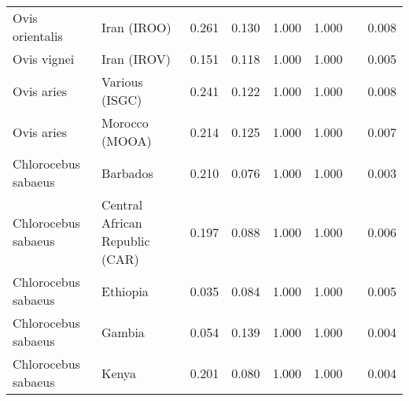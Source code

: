 \begin{center}
\begin{adjustbox}{width = 1\textwidth}
\begin{tabular}{|l|l|r|r|r|r|r|}
     Ovis orientalis &                     Iran (IROO) &                                              0.261 &                                              0.130 &                1.000 &                                  1.000~~ &              0.008 \\
         Ovis vignei &                     Iran (IROV) &                                              0.151 &                                              0.118 &                1.000 &                                  1.000~~ &              0.005 \\
          Ovis aries &                  Various (ISGC) &                                              0.241 &                                              0.122 &                1.000 &                                  1.000~~ &              0.008 \\
          Ovis aries &                  Morocco (MOOA) &                                              0.214 &                                              0.125 &                1.000 &                                  1.000~~ &              0.007 \\
 Chlorocebus sabaeus &                        Barbados &                                              0.210 &                                              0.076 &                1.000 &                                  1.000~~ &              0.003 \\
 Chlorocebus sabaeus &  Central African Republic (CAR) &                                              0.197 &                                              0.088 &                1.000 &                                  1.000~~ &              0.006 \\
 Chlorocebus sabaeus &                        Ethiopia &                                              0.035 &                                              0.084 &                1.000 &                                  1.000~~ &              0.005 \\
 Chlorocebus sabaeus &                          Gambia &                                              0.054 &                                              0.139 &                1.000 &                                  1.000~~ &              0.004 \\
 Chlorocebus sabaeus &                           Kenya &                                              0.201 &                                              0.080 &                1.000 &                                  1.000~~ &              0.004 \\

\end{tabular}
\end{adjustbox}
\end{center}
